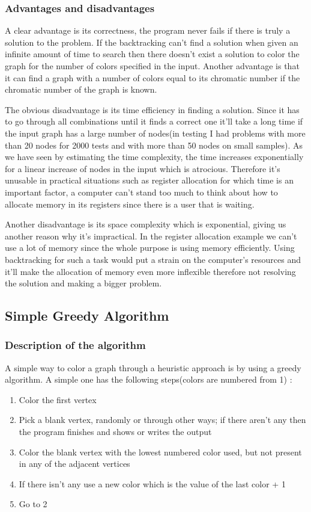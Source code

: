 \documentclass[runningheads]{llncs}
\begin{document}
\subsubsection{Advantages and disadvantages}
A clear advantage is its correctness, the program never fails if there is truly a solution to the problem.
If the backtracking can't find a solution when given an infinite amount of time to search then there
doesn't exist a solution to color the graph for the number of colors specified in the input. Another 
advantage is that it can find a graph with a number of colors equal to its chromatic number if
the chromatic number of the graph is known.

The obvious disadvantage is its time efficiency in finding a solution. Since it has to go through all
combinations until it finds a correct one it'll take a long time if the input graph has a large number
of nodes(in testing I had problems with more than 20 nodes for 2000 tests and with more than 50 nodes on small samples). As we have seen by estimating the time
complexity, the time increases exponentially for a linear increase of nodes in the input which is
atrocious. Therefore it's unusable in practical situations such as register allocation for which
time is an important factor, a computer can't stand too much to think about how to allocate memory
in its registers since there is a user that is waiting.

Another disadvantage is its space complexity which is exponential, giving us another reason why
it's impractical. In the register allocation example we can't use a lot of memory since the whole
purpose is using memory efficiently. Using backtracking for such a task would put a strain on the
computer's resources and it'll make the allocation of memory even more inflexible therefore not
resolving the solution and making a bigger problem.

\subsection{Simple Greedy Algorithm}
\subsubsection{Description of the algorithm}
A simple way to color a graph through a heuristic approach is by using a greedy algorithm. A simple
one has the following steps(colors are numbered from 1) \cite{ref_url8}:

\begin{enumerate}
	\item Color the first vertex
	\item Pick a blank vertex, randomly or through other ways; if there aren't any then the program finishes and shows or writes the output
	\item Color the blank vertex with the lowest numbered color used, but not present in any of the adjacent vertices
	\item If there isn't any use a new color which is the value of the last color + 1
	\item Go to 2
\end{enumerate}
\end{document}

